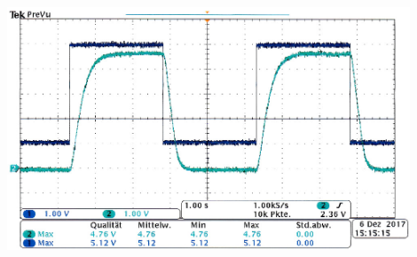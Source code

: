     \begin{center}
        \captionsetup{type=figure}
        \begin{adjustbox}{max width=\linewidth, keepaspectratio}
            \includegraphics[width=120mm]{jpg/Sinus-Regler-aus}
        \end{adjustbox}
        \label{fig:Sinus-Regler-aus}
    \end{center}
\endminipage
%

